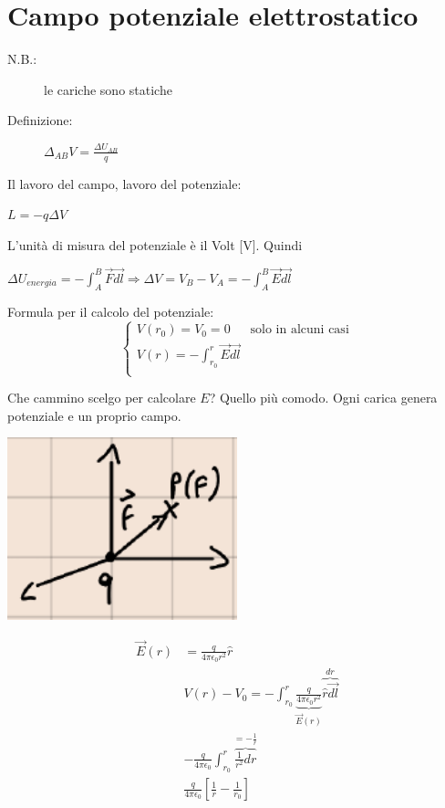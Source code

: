 \documentclass{book}
\begin{document}
\section{Campo potenziale elettrostatico}

\begin{description}
    \item[N.B.:] le cariche sono statiche
    \item[Definizione:] $\Delta_{AB}V=\frac{\Delta U_{AB}}{q}$ 
\end{description}

Il lavoro del campo, lavoro del potenziale:
\begin{center}
    \item $L=-q\Delta V$
\end{center}

L'unità di misura del potenziale è il Volt [V].
Quindi

\begin{center}

    $\Delta U_{energia} = -\int_A^B \vec{F}\vec{dl} \Rightarrow 
\Delta V=V_B-V_A=-\int_A^B\vec{E}\vec{dl}$

\end{center}
Formula per il calcolo del potenziale:
\[
\begin{cases}
V(r_0) = V_0 = 0 & \mbox{solo in alcuni casi} \\
V(r) = -\int_{r_0}^{r} \vec{E} \vec{dl} \\
\end{cases}
\]

Che cammino scelgo per calcolare $E$? Quello più comodo. Ogni carica genera potenziale e un proprio campo.

\begin{center}
	\includegraphics[width=0.5\textwidth]{gr_part.png}
\end{center}      

\[
\begin{split}
	\vec{E} (r) &= \frac{q}{4\pi \epsilon_0 r^2} \hat{r} \\
	&V(r) - V_0 = -\int_{r_0}^{r} \underbrace{\frac{q}{4\pi \epsilon_0 r^2} }_{\vec{E}(r)} \overbrace{\hat{r} \vec{dl}}^{dr} \\
	&-\frac{q}{4\pi \epsilon_0} \int_{r_0}^{r} \overbrace{\frac{1}{r^2}dr}^{=-\frac{1}{r}} \\
	&\frac{q}{4\pi \epsilon_0}[\frac{1}{r} - \frac{1}{r_0}] \\
\end{split}  
\]      
\end{document}
